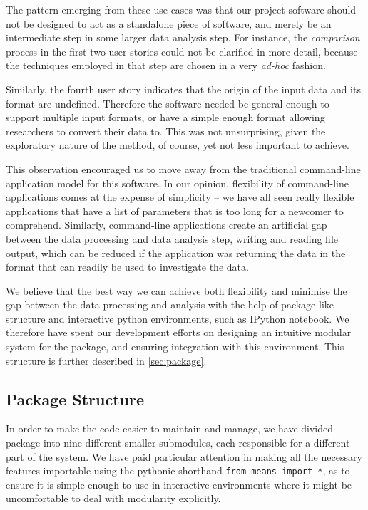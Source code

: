 The pattern emerging from these use cases was that our project software should not be designed to act as a standalone piece of software, and merely be an intermediate step in some larger data analysis step.
For instance, the \emph{comparison} process in the first two user stories could not be clarified in more detail, because the techniques employed in that step are chosen in a very \emph{ad-hoc} fashion.

Similarly, the fourth user story indicates that the origin of the input data and its format are undefined.
Therefore the software needed be general enough to support multiple input formats, or have a simple enough format allowing researchers to convert their data to.
This was not unsurprising, given the exploratory nature of the method, of course, yet not less important to achieve.

This observation encouraged us to move away from the traditional command-line application model for this software.
In our opinion, flexibility of command-line applications comes at the expense of simplicity -- we have all seen really flexible applications that have a list of parameters that is too long for a newcomer to comprehend.
Similarly, command-line applications create an artificial gap between the data processing and data analysis step, \ie{} writing and reading file output, which can be reduced if the application was returning the data in the format that can readily be used to investigate the data.

We believe that the best way we can achieve both flexibility and minimise the gap between the data processing and analysis with the help of package-like structure and interactive python environments, such as IPython notebook.
We therefore have spent our development efforts on designing an intuitive modular system for the package, and ensuring integration with this environment.
This structure is further described in \autoref{sec:package}.


\subsection{Package Structure}
\label{sec:package}

In order to make the code easier to maintain and manage, we have divided \means{} package into nine different smaller submodules, each responsible for a different part of the system.
We have paid particular attention in making all the necessary features importable using the pythonic shorthand \verb"from means import *", 
as to ensure it is simple enough to use \means{} in interactive environments where it might be uncomfortable to deal with modularity explicitly.


